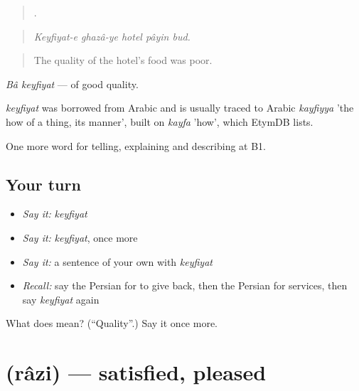 \begin{quote}
    .
\end{quote}

\begin{quote}
\emph{Keyfiyat-e ghazâ-ye hotel pâyin bud.}
\end{quote}

\begin{quote}
The quality of the hotel's food was poor.
\end{quote}

\emph{Bâ keyfiyat} — of good quality.

\begin{cousinweb}
\emph{keyfiyat} was borrowed from Arabic and is usually traced to Arabic \emph{kayfiyya} 'the how of a thing, its manner', built on \emph{kayfa} 'how', which EtymDB lists.
\end{cousinweb}

\begin{grammarlens}[title={What you've built}]
One more word for telling, explaining and describing at B1.
\end{grammarlens}

\subsection*{Your turn}
\begin{itemize}
\raggedright
  \item \emph{Say it:} \emph{keyfiyat}
  \item \emph{Say it:} \emph{keyfiyat}, once more
  \item \emph{Say it:} a sentence of your own with \emph{keyfiyat}
  \item \emph{Recall:} say the Persian for to give back, then the Persian for services, then say \emph{keyfiyat} again
\end{itemize}

\begin{tcolorbox}[breakable,colback=teal!4,colframe=teal!35!black,title={Before you move on}]
What does  mean? (\textquotedblleft{}Quality\textquotedblright{}.) Say it once more.
\end{tcolorbox}
\section[\texorpdfstring{\fa{راضی} (râzi)}{راضی (râzi)}]{ (râzi) — satisfied, pleased}

\label{lesson:FA-C443-razi}




